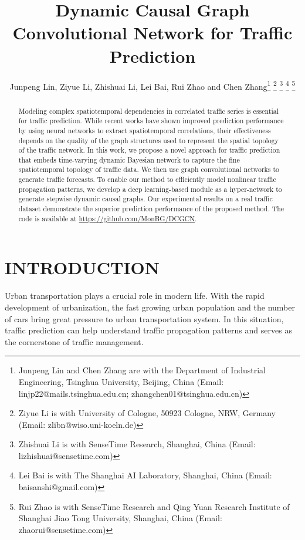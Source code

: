 \documentclass[letterpaper, 10 pt, conference]{ieeeconf}
\title{\LARGE \bf
Dynamic Causal Graph Convolutional Network for Traffic Prediction
}
\author{Junpeng Lin, Ziyue Li, Zhishuai Li, Lei Bai, Rui Zhao and Chen Zhang\thanks{Junpeng Lin and Chen Zhang are with the Department of Industrial Engineering, Tsinghua University, Beijing, China (Email: linjp22@mails.tsinghua.edu.cn; zhangchen01@tsinghua.edu.cn)}
\thanks{Ziyue Li is with University of Cologne, 50923 Cologne, NRW, Germany (Email: zlibn@wiso.uni-koeln.de)}
\thanks{Zhishuai Li is with SenseTime Research, Shanghai, China (Email: lizhishuai@sensetime.com)}
\thanks{Lei Bai is with The Shanghai AI Laboratory, Shanghai, China (Email: baisanshi@gmail.com)}
\thanks{Rui Zhao is with SenseTime Research and Qing Yuan Research Institute of Shanghai Jiao Tong University, Shanghai, China (Email: zhaorui@sensetime.com)}
}
\begin{document}
\maketitle
\thispagestyle{empty}
\pagestyle{empty}




\begin{abstract}



Modeling complex spatiotemporal dependencies in correlated traffic series is essential for traffic prediction. While recent works have shown improved prediction performance by using neural networks to extract spatiotemporal correlations, their effectiveness depends on the quality of the graph structures used to represent the spatial topology of the traffic network. In this work, we propose a novel approach for traffic prediction that embeds time-varying dynamic Bayesian network to capture the fine spatiotemporal topology of traffic data. We then use graph convolutional networks to generate traffic forecasts. To enable our method to efficiently model nonlinear traffic propagation patterns, we develop a deep learning-based module as a hyper-network to generate stepwise dynamic causal graphs. Our experimental results on a real traffic dataset demonstrate the superior prediction performance of the proposed method. The code is available at \url{https://github.com/MonBG/DCGCN}.

\end{abstract}


\section{INTRODUCTION}










Urban transportation plays a crucial role in modern life. With the rapid development of urbanization, the fast growing urban population and the number of cars bring great pressure to urban transportation system. In this situation, traffic prediction can help understand traffic propagation patterns and serves as the cornerstone of traffic management. 
\end{document}
